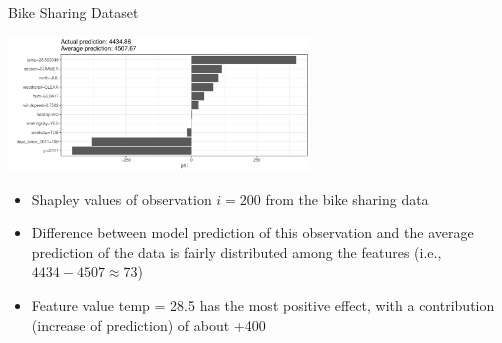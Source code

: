\documentclass[11pt,compress,t,notes=noshow, aspectratio=169, xcolor=table]{beamer}
\begin{document}

\begin{frame}{Bike Sharing Dataset}

\begin{center}
\includegraphics[width=0.6\textwidth]{figure/shapley-bike.pdf}%
\end{center}

\begin{itemize}
    \item Shapley values of observation $i = 200$ from the bike sharing data
    \item Difference between model prediction of this observation and the average prediction of the data is fairly distributed among the features (i.e., $4434 - 4507 \approx 73 $)
    \item Feature value temp = 28.5 has the most positive effect, with a contribution (increase of prediction) of about +400
\end{itemize}
\end{frame}


\end{document}
